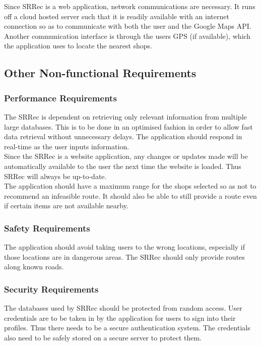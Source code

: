 \documentclass[10pt,twocolumn]{witseiepaper}
\begin{document}
		Since SRRec is a web application, network communications are necessary. It runs off a cloud hosted server such that it is readily available with an internet connection so as to communicate with both the user and the Google Maps API. Another communication interface is through the users GPS (if available), which the application uses to locate the nearest shops.
		
		\subsection{Other Non-functional Requirements}
		
		\subsubsection{Performance Requirements}
		
		The SRRec is dependent on retrieving only relevant information from multiple large databases. This is to be done in an optimised fashion in order to allow fast data retrieval without unnecessary delays. The application should respond in real-time as the user inputs information.\\
		
		Since the SRRec is a website application, any changes or updates made will be automatically available to the user the next time the website is loaded. Thus SRRec will always be up-to-date.\\
		
		The application should have a maximum range for the shops selected so as not to recommend an infeasible route. It should also be able to still provide a route even if certain items are not available nearby.
		
		\subsubsection{Safety Requirements}
		
		The application should avoid taking users to the wrong locations, especially if those locations are in dangerous areas. The SRRec should only provide routes along known roads.
		
		\subsubsection{Security Requirements}
		
		The databases used by SRRec should be protected from random access. User credentials are to be taken in by the application for users to sign into their profiles. Thus there needs to be a secure authentication system. The credentials also need to be safely stored on a secure server to protect them.
		
\end{document}
